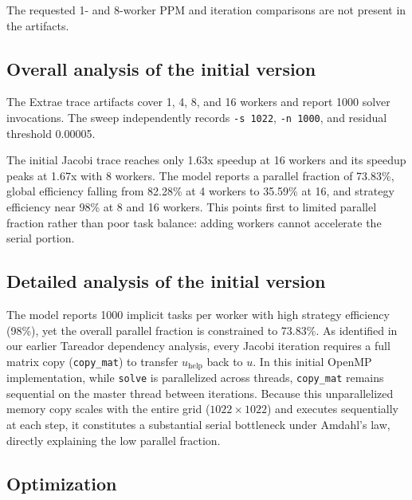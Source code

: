 \documentclass[11pt,a4paper]{article}
\begin{document}
The requested 1- and 8-worker PPM and iteration comparisons are not
present in the artifacts.

\subsection{Overall analysis of the initial version}

The Extrae trace artifacts cover 1, 4, 8, and 16 workers and report
1000 solver invocations. The sweep independently records
\texttt{-s 1022}, \texttt{-n 1000}, and residual threshold 0.00005.



The initial Jacobi trace reaches only 1.63x speedup at 16 workers and
its speedup peaks at 1.67x with 8 workers. The model reports a parallel
fraction of 73.83\%, global efficiency falling from 82.28\% at 4 workers
to 35.59\% at 16, and strategy efficiency near 98\% at 8 and 16 workers.
This points first to limited parallel fraction rather than poor task
balance: adding workers cannot accelerate the serial portion.

\subsection{Detailed analysis of the initial version}

The model reports 1000 implicit tasks per worker with high strategy efficiency
(98\%), yet the overall parallel fraction is constrained to 73.83\%.
As identified in our earlier Tareador dependency analysis, every Jacobi
iteration requires a full matrix copy (\texttt{copy\_mat}) to transfer
$u_{\mathrm{help}}$ back to $u$. In this initial OpenMP implementation,
while \texttt{solve} is parallelized across threads, \texttt{copy\_mat}
remains sequential on the master thread between iterations. Because this
unparallelized memory copy scales with the entire grid ($1022 \times 1022$)
and executes sequentially at each step, it constitutes a substantial serial
bottleneck under Amdahl's law, directly explaining the low parallel fraction.

\subsection{Optimization}
\end{document}
